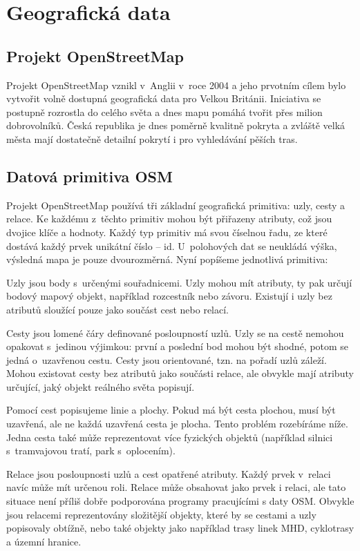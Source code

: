 \chapter{Geografická data}
\section{Projekt OpenStreetMap}
Projekt OpenStreetMap \cite{osmweb} vznikl v~Anglii v~roce 2004 a jeho prvotním cílem bylo
vytvořit volně dostupná geografická data pro Velkou Británii. Iniciativa se
postupně rozrostla do celého světa a dnes mapu pomáhá tvořit přes milion
dobrovolníků. Česká republika je dnes poměrně kvalitně pokryta a zvláště velká
města mají dostatečně detailní pokrytí i pro vyhledávání pěších tras.

\section{Datová primitiva OSM} 
Projekt OpenStreetMap používá tři základní geografická primitiva: uzly, cesty a
relace. Ke každému z~těchto primitiv mohou být přiřazeny atributy, což jsou
dvojice klíče a hodnoty. Každý typ primitiv má svou číselnou řadu, ze které
dostává každý prvek unikátní číslo -- id. 
U~polohových dat se neukládá výška, výsledná mapa je pouze dvourozměrná.
Nyní popíšeme jednotlivá primitiva:

{\tuc Uzly} jsou body s~určenými souřadnicemi. Uzly mohou mít atributy, ty pak
určují bodový mapový objekt, například rozcestník nebo závoru. Existují i uzly
bez atributů sloužící pouze jako součást cest nebo relací.

{\tuc Cesty} jsou lomené čáry definované posloupností uzlů. Uzly se na cestě nemohou opakovat
s~jedinou výjimkou: první a poslední bod mohou být shodné, potom se jedná
o~uzavřenou cestu. Cesty jsou orientované, tzn. na pořadí uzlů záleží. Mohou
existovat cesty bez atributů jako součásti relace, ale obvykle mají atributy
určující, jaký objekt reálného světa popisují.

Pomocí cest popisujeme linie a plochy. Pokud má být cesta plochou, musí být
uzavřená, ale ne každá uzavřená cesta je plocha. Tento problém rozebíráme níže.
Jedna cesta také může reprezentovat více fyzických objektů (například silnici
s~tramvajovou tratí, park s~oplocením).

{\tuc Relace} jsou posloupnosti uzlů a cest opatřené atributy. Každý prvek
v~relaci navíc může mít určenou roli. Relace může obsahovat jako prvek i relaci,
ale tato situace není příliš dobře podporována programy pracujícími s daty OSM. 
Obvykle jsou relacemi reprezentovány složitější objekty, které by se cestami a
uzly popisovaly obtížně, nebo také  objekty jako například
trasy linek MHD, cyklotrasy a územní hranice.

